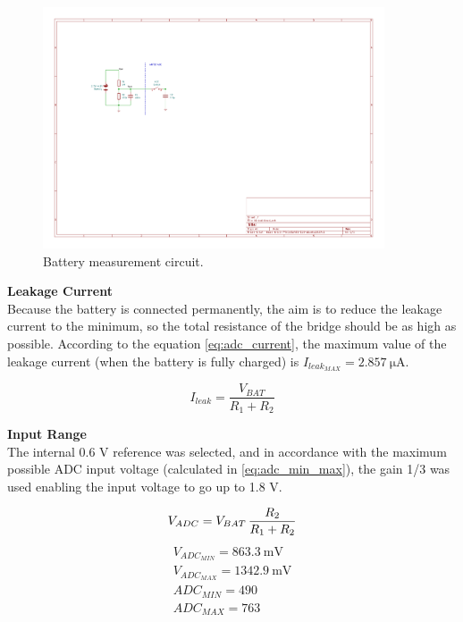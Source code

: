         \begin{figure} [!ht]
    	    \centering
    	    \includegraphics[width=0.9\textwidth]{SW_Firmware/Figs/battery_measurment.pdf}
            \caption {Battery measurement circuit.}
            \label{figure:circuit_battery}
        \end{figure}  
        
        \textbf{Leakage Current}\\ 
        Because the battery is connected permanently, the aim is to reduce the leakage current to the minimum, so the total resistance of the bridge should be as high as possible. According to the equation \ref{eq:adc_current}, the maximum value of the leakage current (when the battery is fully charged) is $I_{leak_{MAX}} = \SI{2.857}{\micro\ampere}$.
        
        \begin{equation}
        \label{eq:adc_current}
            I_{leak} = \frac{V_{BAT}}{R_1 + R_2}
        \end{equation}
        
         
        \textbf{Input Range}\\ 
        The internal 0.6 V reference was selected, and in accordance with the maximum possible ADC input voltage (calculated in \ref{eq:adc_min_max}), the gain  1/3 was used enabling the input voltage to go up to 1.8 V.
        
        \begin{equation}
        \label{eq:adc_min_max}\\
            V_{ADC} = V_{BAT} \, \frac{R_2}{R_1 + R_2}
        \end{equation}
        \begin{align*}
            V_{ADC_{MIN}} = \SI{863.3}{\milli\volt}\\
            V_{ADC_{MAX}} = \SI{1342.9}{\milli\volt}\\
            ADC_{MIN} = 490\\
            ADC_{MAX} = 763
        \end{align*} 
        
